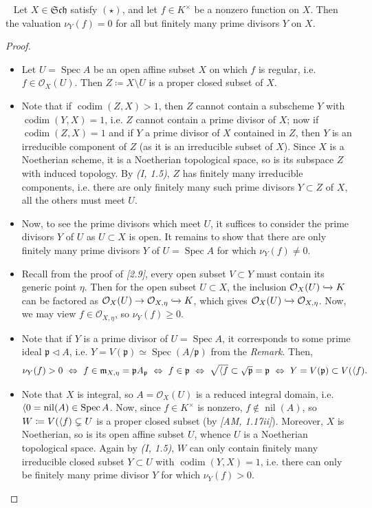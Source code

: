\documentclass[11pt,a4paper,footinclude=true,headinclude=true]{scrbook} %
\DeclareMathOperator{\Spec}{Spec}
\DeclareMathOperator{\nil}{nil}
\DeclareMathOperator{\codim}{codim}
\newcommand{\OO}{\mathcal{O}}
\newcommand{\pp}{\mathfrak{p}}
\newcommand{\mm}{\mathfrak{m}}
\newcommand{\Sch}{\mathfrak{Sch}}
\newcommand{\<}{\langle}
\let\>\relax
\newcommand{\>}{\rangle}
\newenvironment{lemma}[2][]
{\renewcommand\theinnercustomlemma{#2}\innercustomlemma[#1]
\begin{mdframed}[backgroundcolor=gray!20]\ }
{\end{mdframed}\endinnercustomprop}
\begin{document}
\begin{lemma}{6.1}
    Let $X\in\Sch$ satisfy $(\star)$, and let $f\in K^\times$ be a nonzero function on $X$. Then the valuation $\nu_Y(f)=0$ for all but finitely many prime divisors $Y$ on $X$.
\end{lemma}
\begin{proof}\mbox{}
    \begin{itemize}
        \item Let $U=\Spec A$ be an open affine subset $X$ on which $f$ is regular, i.e. $f\in\OO_X(U)$. Then $Z\coloneqq X\setminus U$ is a proper closed subset of $X$.
        \item Note that if $\codim(Z,X)>1$, then $Z$ cannot contain a subscheme $Y$ with $\codim(Y,X)=1$, i.e. $Z$ cannot contain a prime divisor of $X$; now if $\codim(Z,X)=1$ and if $Y$ a prime divisor of $X$ contained in $Z$, then $Y$ is an irreducible component of $Z$ (as it is an irreducible subset of $X$). Since $X$ is a Noetherian scheme, it is a Noetherian topological space, so is its subspace $Z$ with induced topology. By \textit{(I, 1.5)}, $Z$ has finitely many irreducible components, i.e. there are only finitely many such prime divisors $Y\subset Z$ of $X$, all the others must meet $U$. 
        \item Now, to see the prime divisors which meet $U$, it suffices to consider the prime divisors $Y$ of $U$ as $U\subset X$ is open. It remains to show that there are only finitely many prime divisors $Y$ of $U=\Spec A$ for which $\nu_Y(f)\neq0$.
        \item Recall from the proof of \textit{[2.9]}, every open subset $V\subset Y$ must contain its generic point $\eta$. Then for the open subset $U\subset X$, the inclusion $\OO_X(U)\xhookrightarrow{}K$ can be factored as $\OO_X(U)\to\OO_{X,\eta}\xhookrightarrow{}K$, which gives $\OO_X(U)\xhookrightarrow{}\OO_{X,\eta}$. Now, we may view $f\in\OO_{X,\eta}$, so $\nu_Y(f)\geq0$.
        \item Note that if $Y$ is a prime divisor of $U=\Spec A$, it corresponds to some prime ideal $\pp\triangleleft A$, i.e. $Y=V(\pp)\simeq\Spec(A/\pp)$ from the \textit{Remark}. Then,
        \begin{align*}
            \nu_Y(f)>0\ \Leftrightarrow\ f\in\mm_{X,\eta}=\pp A_\pp\ \Leftrightarrow\ f\in\pp\ \Leftrightarrow\ \sqrt{\<f\>}\subset\sqrt{\pp}=\pp\ \Leftrightarrow\ Y=V(\pp)\subset V(\<f\>).
        \end{align*}
        \item Note that $X$ is integral, so $A=\OO_X(U)$ is a reduced integral domain, i.e. $\<0\>=\nil(A)\in\Spec A$. Now, since $f\in K^\times$ is nonzero, $f\notin\nil(A)$, so $W\coloneqq V(\<f\>)\subsetneq U$ is a proper closed subset (by \textit{[AM, 1.17ii]}). Moreover, $X$ is Noetherian, so is its open affine subset $U$, whence $U$ is a Noetherian topological space. Again by \textit{(I, 1.5)}, $W$ can only contain finitely many irreducible closed subset $Y\subset U$ with $\codim(Y,X)=1$, i.e. there can only be finitely many prime divisor $Y$ for which $\nu_Y(f)>0$.
    \end{itemize}
\end{proof}
\end{document}
